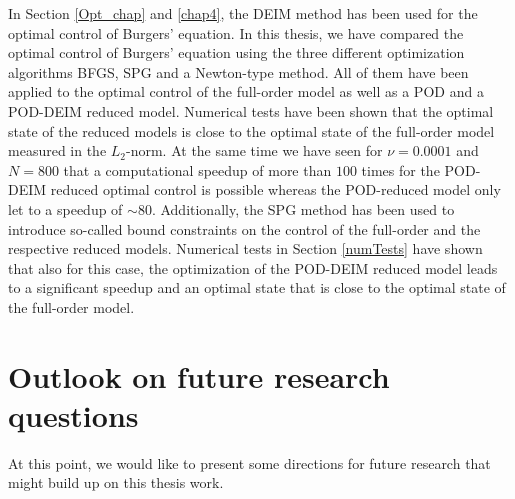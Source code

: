 In Section \ref{Opt_chap} and \ref{chap4}, the DEIM method has been used for the optimal control of Burgers' equation. In this thesis, we have compared the optimal control of Burgers' equation using the three different optimization algorithms BFGS, SPG and a Newton-type method. All of them have been applied to the optimal control of the full-order model as well as a POD and a POD-DEIM reduced model. Numerical tests have been shown that the optimal state of the reduced models is close to the optimal state of the full-order model measured in the $L_2$-norm. At the same time we have seen for $\nu = 0.0001$ and $N = 800$ that a computational speedup of more than $100$ times for the POD-DEIM reduced optimal control is possible whereas the POD-reduced model only let to a speedup of $\sim 80$. Additionally, the SPG method has been used to introduce so-called bound constraints on the control of the full-order and the respective reduced models. Numerical tests in Section \ref{numTests} have shown that also for this case, the optimization of the POD-DEIM reduced model leads to a significant speedup and an optimal state that is close to the optimal state of the full-order model.
\section{Outlook on future research questions}
At this point, we would like to present some directions for future research that might build up on this thesis work.
